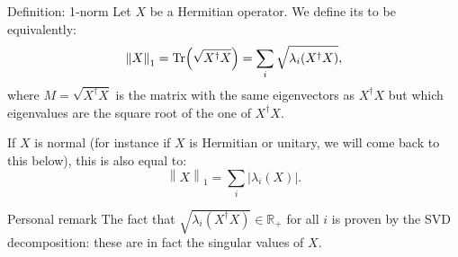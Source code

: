 \documentclass[a4paper]{article}
\begin{document}
\begin{parag}{Definition: 1-norm}
    Let $X$ be a Hermitian operator. We define its  to be equivalently: 
    \[\left\|X\right\|_1 = \Tr\left(\sqrt{X^{\dagger} X}\right) = \sum_{i} \sqrt{\lambda_i\left(X^{\dagger} X\right)},\]
    where $M = \sqrt{X^{\dagger} X}$ is the matrix with the same eigenvectors as $X^{\dagger} X$ but which eigenvalues are the square root of the one of $X^{\dagger} X$. 

    If $X$ is normal (for instance if $X$ is Hermitian or unitary, we will come back to this below), this is also equal to:
    \[\left\|X\right\|_1 = \sum_{i} \left|\lambda_i\left(X\right)\right|.\]

    \begin{subparag}{Personal remark}
        The fact that $\sqrt{\lambda_i\left(X^{\dagger} X\right)} \in \mathbb{R}_+$ for all $i$ is proven by the SVD decomposition: these are in fact the singular values of $X$.
    \end{subparag}
\end{parag}
\end{document}
